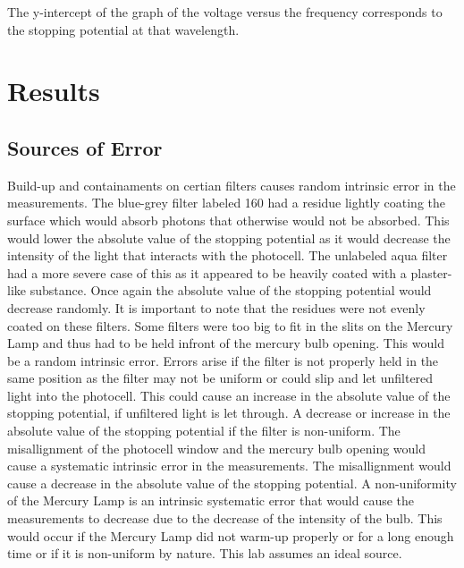 \documentclass[a4paper]{article}
\begin{document}

\qq The y-intercept of the graph of the voltage versus the
frequency corresponds to the stopping potential at that wavelength. 
 

\section{Results}


\subsection{Sources of Error}

\qq Build-up and containaments on certian filters causes random
intrinsic error in the measurements. The blue-grey filter labeled 160
had a residue lightly coating the surface which would absorb photons
that otherwise would not be absorbed. This would lower the absolute
value of the stopping potential as it would decrease the intensity of
the light that interacts with the photocell. The unlabeled aqua filter
had a more severe case of this as it appeared to be heavily coated
with a plaster-like substance. Once again the absolute value of the
stopping potential would decrease randomly. It is important to note
that the residues were not evenly coated on these filters. Some
filters were too big to fit in the slits on the Mercury Lamp and thus
had to be held infront of the mercury bulb opening. This would be a
random intrinsic error. Errors arise if the filter is not properly
held in the same position as the filter may not be uniform or could
slip and let unfiltered light into the photocell. This could cause an
increase in the absolute value of the stopping potential, if
unfiltered light is let through. A decrease or increase in the
absolute value of the stopping potential if the filter is
non-uniform. The misallignment of the photocell window and the mercury
bulb opening would cause a systematic intrinsic error in the
measurements. The misallignment would cause a decrease in the absolute
value of the stopping potential. A non-uniformity of the Mercury Lamp
is an intrinsic systematic error that would cause the measurements to
decrease due to the decrease of the intensity of the bulb. This would
occur if the Mercury Lamp did not warm-up properly or for a long
enough time or if it is non-uniform by nature. This lab assumes an
ideal source.
\end{document}
